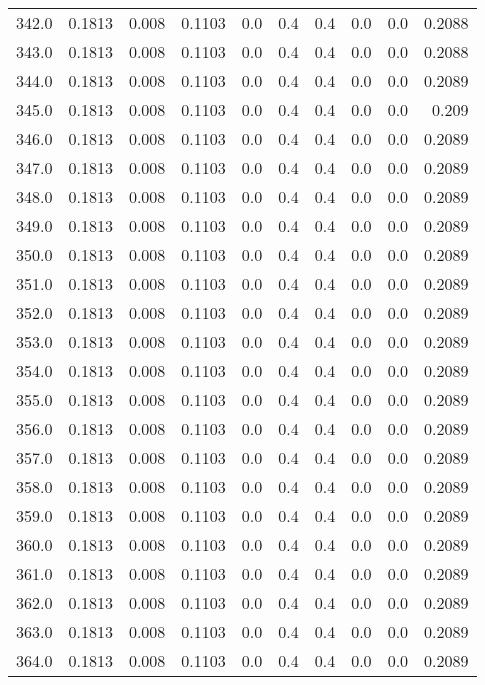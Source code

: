 \begin{longtable}{lrrrrrrrrr}
342.0 & 0.1813 & 0.008 & 0.1103 & 0.0 & 0.4 & 0.4 & 0.0 & 0.0 & 0.2088 \\
343.0 & 0.1813 & 0.008 & 0.1103 & 0.0 & 0.4 & 0.4 & 0.0 & 0.0 & 0.2088 \\
344.0 & 0.1813 & 0.008 & 0.1103 & 0.0 & 0.4 & 0.4 & 0.0 & 0.0 & 0.2089 \\
345.0 & 0.1813 & 0.008 & 0.1103 & 0.0 & 0.4 & 0.4 & 0.0 & 0.0 & 0.209 \\
346.0 & 0.1813 & 0.008 & 0.1103 & 0.0 & 0.4 & 0.4 & 0.0 & 0.0 & 0.2089 \\
347.0 & 0.1813 & 0.008 & 0.1103 & 0.0 & 0.4 & 0.4 & 0.0 & 0.0 & 0.2089 \\
348.0 & 0.1813 & 0.008 & 0.1103 & 0.0 & 0.4 & 0.4 & 0.0 & 0.0 & 0.2089 \\
349.0 & 0.1813 & 0.008 & 0.1103 & 0.0 & 0.4 & 0.4 & 0.0 & 0.0 & 0.2089 \\
350.0 & 0.1813 & 0.008 & 0.1103 & 0.0 & 0.4 & 0.4 & 0.0 & 0.0 & 0.2089 \\
351.0 & 0.1813 & 0.008 & 0.1103 & 0.0 & 0.4 & 0.4 & 0.0 & 0.0 & 0.2089 \\
352.0 & 0.1813 & 0.008 & 0.1103 & 0.0 & 0.4 & 0.4 & 0.0 & 0.0 & 0.2089 \\
353.0 & 0.1813 & 0.008 & 0.1103 & 0.0 & 0.4 & 0.4 & 0.0 & 0.0 & 0.2089 \\
354.0 & 0.1813 & 0.008 & 0.1103 & 0.0 & 0.4 & 0.4 & 0.0 & 0.0 & 0.2089 \\
355.0 & 0.1813 & 0.008 & 0.1103 & 0.0 & 0.4 & 0.4 & 0.0 & 0.0 & 0.2089 \\
356.0 & 0.1813 & 0.008 & 0.1103 & 0.0 & 0.4 & 0.4 & 0.0 & 0.0 & 0.2089 \\
357.0 & 0.1813 & 0.008 & 0.1103 & 0.0 & 0.4 & 0.4 & 0.0 & 0.0 & 0.2089 \\
358.0 & 0.1813 & 0.008 & 0.1103 & 0.0 & 0.4 & 0.4 & 0.0 & 0.0 & 0.2089 \\
359.0 & 0.1813 & 0.008 & 0.1103 & 0.0 & 0.4 & 0.4 & 0.0 & 0.0 & 0.2089 \\
360.0 & 0.1813 & 0.008 & 0.1103 & 0.0 & 0.4 & 0.4 & 0.0 & 0.0 & 0.2089 \\
361.0 & 0.1813 & 0.008 & 0.1103 & 0.0 & 0.4 & 0.4 & 0.0 & 0.0 & 0.2089 \\
362.0 & 0.1813 & 0.008 & 0.1103 & 0.0 & 0.4 & 0.4 & 0.0 & 0.0 & 0.2089 \\
363.0 & 0.1813 & 0.008 & 0.1103 & 0.0 & 0.4 & 0.4 & 0.0 & 0.0 & 0.2089 \\
364.0 & 0.1813 & 0.008 & 0.1103 & 0.0 & 0.4 & 0.4 & 0.0 & 0.0 & 0.2089 \\

\end{longtable}
